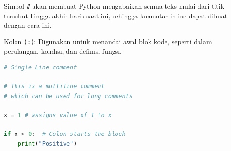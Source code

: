 \documentclass{article}
\begin{document}
Simbol \verb|#| akan membuat Python mengabaikan semua teks mulai dari titik tersebut hingga akhir baris saat ini, sehingga komentar inline dapat dibuat dengan cara ini.

Kolon \verb|(:)|: Digunakan untuk menandai awal blok kode, seperti dalam perulangan, kondisi, dan definisi fungsi.

\begin{lstlisting}[language=Python, caption={}, captionpos=b]
# Single Line comment

# This is a multiline comment
# which can be used for long comments

x = 1 # assigns value of 1 to x

if x > 0:  # Colon starts the block
    print("Positive")
\end{lstlisting}
\end{document}
